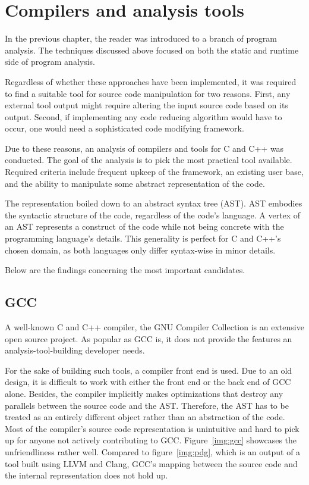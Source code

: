 \chapter{Compilers and analysis tools}


In the previous chapter, the reader was introduced to a branch of program
ana\-ly\-sis. 
The techniques discussed above focused on both the static and runtime
side of program analysis. 

Regardless of whether these approaches have been implemented, it was 
required to find a suitable tool for source code manipulation for two reasons. 
First, any external tool output might require altering the input source code 
based on its output. 
Second, if implementing any code reducing algorithm would have to occur, 
one would need a sophisticated code modifying framework. 

Due to these reasons, an analysis of compilers and tools for C and C++ was conducted. 
The goal of the analysis is to pick the most practical tool available. 
Required criteria include frequent upkeep of the framework, 
an existing user base, and the ability to manipulate some abstract 
representation of the code.

The representation boiled down to an abstract syntax tree (AST). 
AST embodies the syntactic structure of the code, regardless of the code's language. 
A vertex of an AST represents a construct of the code while not being concrete 
with the programming language's details. 
This generality is perfect for C and C++'s chosen domain, 
as both languages only differ syntax-wise in minor details.


Below are the findings concerning the most important candidates.

\section{GCC}

A well-known C and C++ compiler, the GNU Compiler Collection \citep{gcc:online} 
is an extensive
open source project. 
As popular as GCC is, it does not provide the features an analysis-tool-building 
developer needs. 

For the sake of building such tools, a compiler front end is used. 
Due to an old design, it is difficult to work with either the front end or 
the back end of GCC alone. 
Besides, the compiler implicitly makes optimizations that destroy any parallels 
between the source code and the AST. 
Therefore, the AST has to be treated as an entirely different object rather than 
an abstraction of the code. 
Most of the compiler's source code representation is unintuitive and 
hard to pick up for anyone not actively contributing to GCC. 
Figure~\ref{img:gcc} showcases the unfriendliness rather well.
Compared to figure~\ref{img:pdg}, which is an output of a tool built using
LLVM and Clang, GCC's mapping between the source code and the internal
representation does not hold up.


